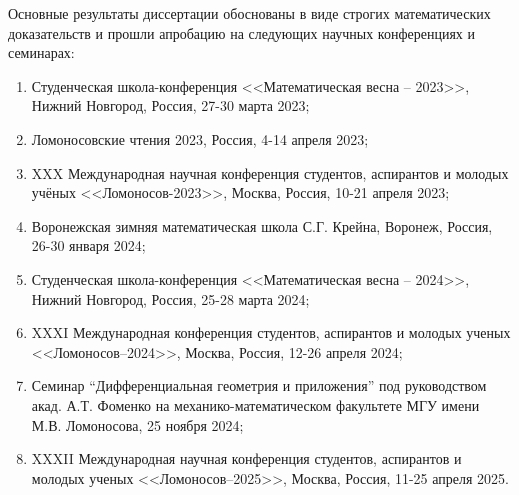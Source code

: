 {\probation}
Основные результаты диссертации обоснованы в виде строгих математических доказательств и прошли апробацию на следующих научных конференциях и семинарах:

\begin{enumerate}%
\item Студенческая школа-конференция <<Математическая весна --  2023>>, Нижний Новгород, Россия, 27-30 марта 2023;

\item Ломоносовские чтения 2023, Россия, 4-14 апреля 2023;

\item XXX Международная научная конференция студентов, аспирантов и молодых учёных <<Ломоносов-2023>>,  Москва, Россия, 10-21 апреля 2023;

\item Воронежская зимняя математическая школа С.Г. Крейна, Воронеж, Россия, 26-30 января 2024;

\item Студенческая школа-конференция <<Математическая весна -- 2024>>, Нижний Новгород, Россия, 25-28 марта 2024;

\item XXXI Международная конференция студентов, аспирантов и молодых ученых <<Ломоносов--2024>>, Москва, Россия, 12-26 апреля 2024;

\item Семинар “Дифференциальная геометрия и приложения” под руководством акад. А.Т. Фоменко на механико-математическом факультете МГУ имени М.В. Ломоносова, 25 ноября 2024;


\item XXXII Международная научная конференция студентов, аспирантов и молодых ученых <<Ломоносов--2025>>, Москва, Россия, 11-25 апреля 2025.
\end{enumerate}


